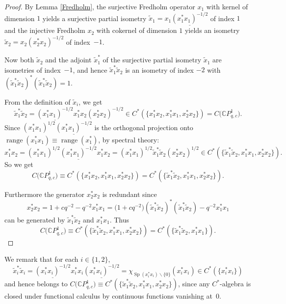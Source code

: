 \documentclass[11pt]{article}
\numberwithin{equation}{section}
\begin{document}
\begin{proof} By Lemma \ref{Fredholm}, the surjective Fredholm operator $x_{1}$ with kernel of
dimension $1$ yields a surjective partial isometry $\tilde{x}_{1}%
=x_{1}\underline{( x_{1}^{\ast}x_{1}) ^{-1/2}}$ of index $1$ and
the injective Fredholm $x_{2}$ with cokernel of dimension $1$ yields an
isometry $\tilde{x}_{2}=x_{2}( x_{2}^{\ast}x_{2}) ^{-1/2}$ of
index~$-1$.

Now both $\tilde{x}_{2}$ and the adjoint $\tilde{x}_{1}^{\ast}$ of the
surjective partial isometry $\tilde{x}_{1}$ are isometries of index~$-1$, and
hence $\tilde{x}_{1}^{\ast}\tilde{x}_{2}$ is an isometry of index $-2$ with
$( \tilde{x}_{1}^{\ast}\tilde{x}_{2}) ^{\ast}( \tilde
{x}_{1}^{\ast}\tilde{x}_{2}) =1$.

From the definition of $\tilde{x}_{i}$, we get
\[
\tilde{x}_{1}^{\ast}\tilde{x}_{2}=\underline{( x_{1}^{\ast}x_{1})
^{-1/2}}x_{1}^{\ast}x_{2}( x_{2}^{\ast}x_{2}) ^{-1/2}\in C^{\ast
}( \{ x_{1}^{\ast}x_{2},x_{1}^{\ast}x_{1},x_{2}^{\ast}%
x_{2}\}) =C\big(\mathbb{C}P_{q,c}^{1}\big) .
\]
Since $( x_{1}^{\ast}x_{1}) ^{1/2}\underline{(
x_{1}^{\ast}x_{1}) ^{-1/2}}$ is the orthogonal projection onto
$\operatorname{range}( x_{1}^{\ast}x_{1}) \equiv
\operatorname{range}( x_{1}^{\ast}) $, by spectral theory:
\[
x_{1}^{\ast}x_{2}=( x_{1}^{\ast}x_{1}) ^{1/2}\underline{(
x_{1}^{\ast}x_{1}) ^{-1/2}}x_{1}^{\ast}x_{2}=( x_{1}^{\ast}%
x_{1}) ^{1/2}\tilde{x}_{1}^{\ast}\tilde{x}_{2}( x_{2}^{\ast}%
x_{2}) ^{1/2}\in C^{\ast}( \{ \tilde{x}_{1}^{\ast}\tilde
{x}_{2},x_{1}^{\ast}x_{1},x_{2}^{\ast}x_{2}\}) .
\]
So we get
\[
C\big(\mathbb{C}P_{q,c}^{1}\big) \equiv C^{\ast}(\{
x_{1}^{\ast}x_{2},x_{1}^{\ast}x_{1},x_{2}^{\ast}x_{2}\})
=C^{\ast}(\{ \tilde{x}_{1}^{\ast}\tilde{x}_{2},x_{1}^{\ast}%
x_{1},x_{2}^{\ast}x_{2}\} ) .
\]


Furthermore the generator $x_{2}^{\ast}x_{2}$ is redundant since%
\[
x_{2}^{\ast}x_{2}=1+cq^{-2}-q^{-2}x_{1}^{\ast}x_{1}=\big( 1+cq^{-2}\big)
 ( \tilde{x}_{1}^{\ast}\tilde{x}_{2} ) ^{\ast} ( \tilde{x}%
_{1}^{\ast}\tilde{x}_{2} ) -q^{-2}x_{1}^{\ast}x_{1}
\]
can be generated by $\tilde{x}_{1}^{\ast}\tilde{x}_{2}$ and $x_{1}^{\ast}%
x_{1}$. Thus
\[
C\big(\mathbb{C}P_{q,c}^{1}\big) \equiv C^{\ast} ( \{
\tilde{x}_{1}^{\ast}\tilde{x}_{2},x_{1}^{\ast}x_{1},x_{2}^{\ast}x_{2} \}
 ) =C^{\ast} ( \{ \tilde{x}_{1}^{\ast}\tilde{x}_{2},x_{1}^{\ast}x_{1} \} ) .\tag*{\qed}
\]
\renewcommand{\qed}{}
\end{proof}


We remark that for each $i\in \{ 1,2 \} $,
\[
\tilde{x}_{i}^{\ast}\tilde{x}_{i}=\underline{( x_{i}^{\ast}x_{i})
^{-1/2}}x_{i}^{\ast}x_{i}\underline{( x_{i}^{\ast}x_{i}) ^{-1/2}%
}=\chi_{\operatorname{Sp}( x_{i}^{\ast}x_{i}) \backslash\{
0\} }( x_{i}^{\ast}x_{i}) \in C^{\ast}( \{
x_{i}^{\ast}x_{i}\} )
\]
and hence belongs to $C\big(\mathbb{C}P_{q,c}^{1}\big) \equiv C^{\ast
} ( \{ \tilde{x}_{1}^{\ast}\tilde{x}_{2},x_{1}^{\ast}x_{1}%
,x_{2}^{\ast}x_{2} \} ) $, since any $C^*$-algebra is closed under
functional calculus by continuous functions vanishing at~$0$.
\end{document}
